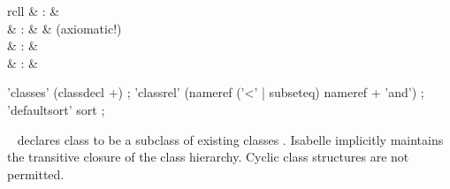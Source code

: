 \begin{isabellebody}
\begin{isamarkuptext}
\begin{description}
  \end{description}%
\end{isamarkuptext}%
\isamarkuptrue%
%
\isamarkuptrue%
%
\isamarkuptrue%
%
\begin{isamarkuptext}%
\begin{matharray}{rcll}
    \hypertarget{command.classes}{\hyperlink{command.classes}{\mbox{}}} & : &  \\
    \hypertarget{command.classrel}{\hyperlink{command.classrel}{\mbox{}}} & : &  & (axiomatic!) \\
    \hypertarget{command.defaultsort}{\hyperlink{command.defaultsort}{\mbox{}}} & : &  \\
    \hypertarget{command.class-deps}{\hyperlink{command.class-deps}{\mbox{}}}\isa{{\isachardoublequote}\isactrlsup {\isacharasterisk}{\isachardoublequote}} & : &  \\
  \end{matharray}

  \begin{rail}
    'classes' (classdecl +)
    ;
    'classrel' (nameref ('<' | subseteq) nameref + 'and')
    ;
    'defaultsort' sort
    ;
  \end{rail}

  \begin{description}

  \item \hyperlink{command.classes}{\mbox{}}~ declares class
   to be a subclass of existing classes .
  Isabelle implicitly maintains the transitive closure of the class
  hierarchy.  Cyclic class structures are not permitted.


\end{description}
\end{isamarkuptext}
\end{isabellebody}
